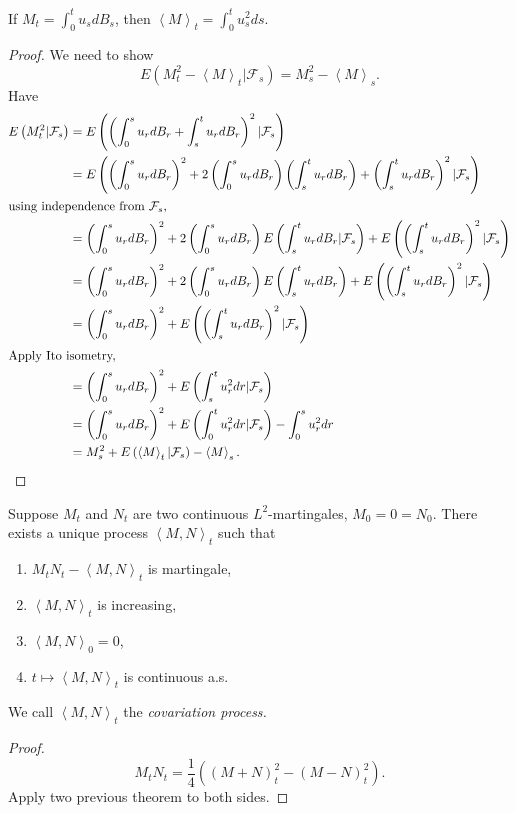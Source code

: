 \begin{claim}
	If $M_t = \int _0^t u_s d B_s$, then $\left\langle M \right\rangle _t = \int _0^t u_s^2 d s$.
\end{claim}
\begin{proof}
	We need to show
	\[
		E\left( M_t^2 - \left\langle M \right\rangle _t | \mathcal{F}_s \right)  = M_s^2 - \left\langle M \right\rangle _s
	.\] 
	Have
	\begin{align*}
		E\left( M_t^2 | \mathcal{F}_s \right) 
		&= E\left(\left( \int _0^s u_r d B_r + \int _s^t u_r d B_r \right) ^2 | \mathcal{F}_s\right) \\
		&= E\left( \left(\int _0^s u_r d B_r \right)^2 + 2\left( \int _0^s u_r d B_r \right) \left( \int _s^t u_r d B_r \right)  + \left( \int _s^t u_r d B_r \right) ^2 | \mathcal{F}_s\right)  \\
		\intertext{using independence from $\mathcal{F}_s$,}
		&= \left(\int _0^s u_r d B_r \right)^2 + 2 \left( \int _0^s u_r d B_r \right) E\left( \int _s^t u_r d B_r | \mathcal{F}_s\right)  + E\left(\left( \int _s^t u_r d B_r \right) ^2 | \mathcal{F}_s\right)  \\
		&= \left(\int _0^s u_r d B_r \right)^2 + 2 \left( \int _0^s u_r d B_r \right) E\left( \int _s^t u_r d B_r \right)  + E\left(\left( \int _s^t u_r d B_r \right) ^2 | \mathcal{F}_s\right)  \\
		&= \left(\int _0^s u_r d B_r \right)^2 + E\left(\left( \int _s^t u_r d B_r \right) ^2 | \mathcal{F}_s\right)  \\
		\intertext{Apply Ito isometry,}
		&= \left(\int _0^s u_r d B_r \right)^2 + E\left( \int _s^t u_r^2 d r | \mathcal{F}_s\right)  \\
		&= \left( \int _0^s u_r d B_r \right) ^2 + E\left( \int _0^t u_r^2 d  r | \mathcal{F}_s \right)  - \int _0^s u_r^2 d r \\
		&= M_s^2 + E\left( \left\langle M \right\rangle _t | \mathcal{F}_s \right)  - \left\langle M \right\rangle _s
	.\end{align*}

\end{proof}

\begin{corollary}[Covariation]
	Suppose $M_t$ and $N_t$ are two continuous $L^2$-martingales, $M_0 = 0 = N_0$. There exists a unique process $\left\langle M, N \right\rangle _t$ such that
	\begin{enumerate}
		\item $M_t N_t - \left\langle M, N \right\rangle _t$ is martingale,
		\item $\left\langle M, N \right\rangle _t$ is increasing,
		\item $\left\langle M, N \right\rangle _0 = 0$,
		\item $t \mapsto \left\langle M, N \right\rangle _t$ is continuous a.s.
	\end{enumerate}
	We call $\left\langle M, N \right\rangle _t$ the \textit{covariation process.}
\end{corollary}
\begin{proof}
	\[
		M_t N_t = \frac{1}{4} \left( (M + N)^2_t - (M - N)^2 _t \right) 
	.\] 
	Apply two previous theorem to both sides.
\end{proof}

